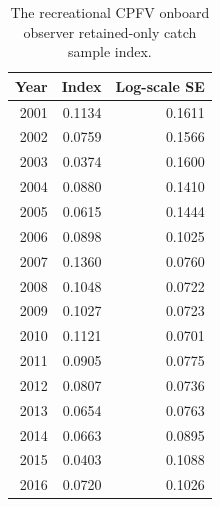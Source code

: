 \documentclass[12pt,]{article}
\begin{document}
\begin{table}[ht]
\centering
\caption{The recreational CPFV
                                            onboard observer retained-only
                                            catch sample index.} 
\label{tab:Fleet12_RecPC_onboard_index}
\begin{tabular}{rrr}
  \hline
Year & Index & Log-scale SE \\ 
  \hline
 2001 & 0.1134 & 0.1611 \\ 
   2002 & 0.0759 & 0.1566 \\ 
   2003 & 0.0374 & 0.1600 \\ 
   2004 & 0.0880 & 0.1410 \\ 
   2005 & 0.0615 & 0.1444 \\ 
   2006 & 0.0898 & 0.1025 \\ 
   2007 & 0.1360 & 0.0760 \\ 
   2008 & 0.1048 & 0.0722 \\ 
   2009 & 0.1027 & 0.0723 \\ 
   2010 & 0.1121 & 0.0701 \\ 
   2011 & 0.0905 & 0.0775 \\ 
   2012 & 0.0807 & 0.0736 \\ 
   2013 & 0.0654 & 0.0763 \\ 
   2014 & 0.0663 & 0.0895 \\ 
   2015 & 0.0403 & 0.1088 \\ 
   2016 & 0.0720 & 0.1026 \\ 
   \hline
\end{tabular}
\end{table}

\FloatBarrier

\vspace{2in}
\end{document}
